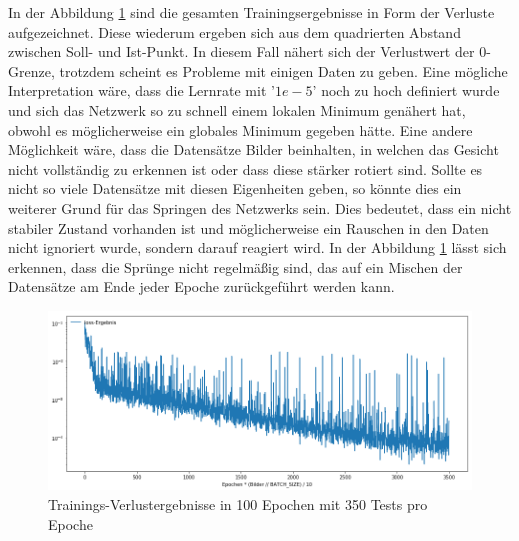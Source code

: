 In der Abbildung \ref{fig:lossDiag} sind die gesamten Trainingsergebnisse in Form der Verluste aufgezeichnet. 
Diese wiederum ergeben sich aus dem quadrierten Abstand zwischen Soll- und Ist-Punkt.
In diesem Fall nähert sich der Verlustwert der $0$-Grenze, trotzdem scheint es Probleme mit einigen Daten zu geben. 
Eine mögliche Interpretation wäre, dass die Lernrate mit '$1e-5$' noch zu hoch definiert wurde und sich das Netzwerk so zu schnell einem lokalen Minimum genähert hat, obwohl es möglicherweise ein globales Minimum gegeben hätte. 
Eine andere Möglichkeit wäre, dass die Datensätze Bilder beinhalten, in welchen das Gesicht nicht vollständig zu erkennen ist oder dass diese stärker rotiert sind. 
Sollte es nicht so viele Datensätze mit diesen Eigenheiten geben, so könnte dies ein weiterer Grund für das Springen des Netzwerks sein. 
Dies bedeutet, dass ein nicht stabiler Zustand vorhanden ist und möglicherweise ein Rauschen in den Daten nicht ignoriert wurde, sondern darauf reagiert wird.
In der Abbildung \ref{fig:lossDiag} lässt sich erkennen, dass die Sprünge nicht regelmäßig sind, das auf ein Mischen der Datensätze am Ende jeder Epoche zurückgeführt werden kann. 
\begin{figure}[ht!]
	\centering
	\includegraphics[scale=0.4]{images/loss-diagram-all-new.png}
	\caption{Trainings-Verlustergebnisse in 100 Epochen mit 350 Tests pro Epoche}
	\label{fig:lossDiag}
\end{figure} \phantom \newline

